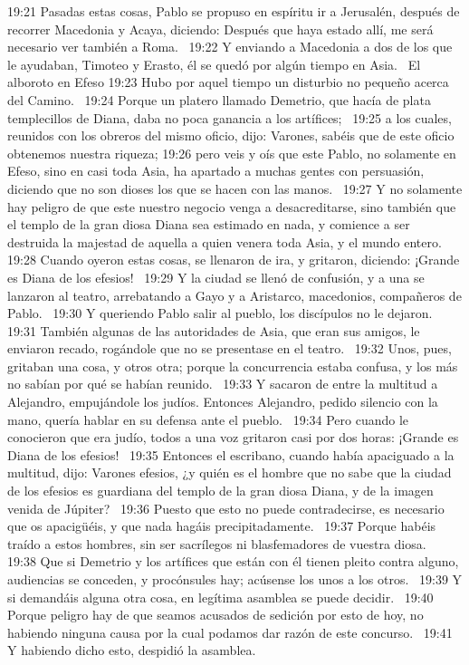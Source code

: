 19:21 Pasadas estas cosas, Pablo se propuso en espíritu ir a Jerusalén, después de recorrer Macedonia y Acaya, diciendo: Después que haya estado allí, me será necesario ver también a Roma.  
19:22 Y enviando a Macedonia a dos de los que le ayudaban, Timoteo y Erasto, él se quedó por algún tiempo en Asia.  
El alboroto en Efeso 
19:23 Hubo por aquel tiempo un disturbio no pequeño acerca del Camino.  
19:24 Porque un platero llamado Demetrio, que hacía de plata templecillos de Diana, daba no poca ganancia a los artífices;  
19:25 a los cuales, reunidos con los obreros del mismo oficio, dijo: Varones, sabéis que de este oficio obtenemos nuestra riqueza; 
19:26 pero veis y oís que este Pablo, no solamente en Efeso, sino en casi toda Asia, ha apartado a muchas gentes con persuasión, diciendo que no son dioses los que se hacen con las manos.  
19:27 Y no solamente hay peligro de que este nuestro negocio venga a desacreditarse, sino también que el templo de la gran diosa Diana sea estimado en nada, y comience a ser destruida la majestad de aquella a quien venera toda Asia, y el mundo entero.  
19:28 Cuando oyeron estas cosas, se llenaron de ira, y gritaron, diciendo: ¡Grande es Diana de los efesios!  
19:29 Y la ciudad se llenó de confusión, y a una se lanzaron al teatro, arrebatando a Gayo y a Aristarco, macedonios, compañeros de Pablo.  
19:30 Y queriendo Pablo salir al pueblo, los discípulos no le dejaron.  
19:31 También algunas de las autoridades de Asia, que eran sus amigos, le enviaron recado, rogándole que no se presentase en el teatro.  
19:32 Unos, pues, gritaban una cosa, y otros otra; porque la concurrencia estaba confusa, y los más no sabían por qué se habían reunido.  
19:33 Y sacaron de entre la multitud a Alejandro, empujándole los judíos. Entonces Alejandro, pedido silencio con la mano, quería hablar en su defensa ante el pueblo.  
19:34 Pero cuando le conocieron que era judío, todos a una voz gritaron casi por dos horas: ¡Grande es Diana de los efesios!  
19:35 Entonces el escribano, cuando había apaciguado a la multitud, dijo: Varones efesios, ¿y quién es el hombre que no sabe que la ciudad de los efesios es guardiana del templo de la gran diosa Diana, y de la imagen venida de Júpiter?  
19:36 Puesto que esto no puede contradecirse, es necesario que os apacigüéis, y que nada hagáis precipitadamente.  
19:37 Porque habéis traído a estos hombres, sin ser sacrílegos ni blasfemadores de vuestra diosa.  
19:38 Que si Demetrio y los artífices que están con él tienen pleito contra alguno, audiencias se conceden, y procónsules hay; acúsense los unos a los otros.  
19:39 Y si demandáis alguna otra cosa, en legítima asamblea se puede decidir.  
19:40 Porque peligro hay de que seamos acusados de sedición por esto de hoy, no habiendo ninguna causa por la cual podamos dar razón de este concurso.  
19:41 Y habiendo dicho esto, despidió la asamblea.  
